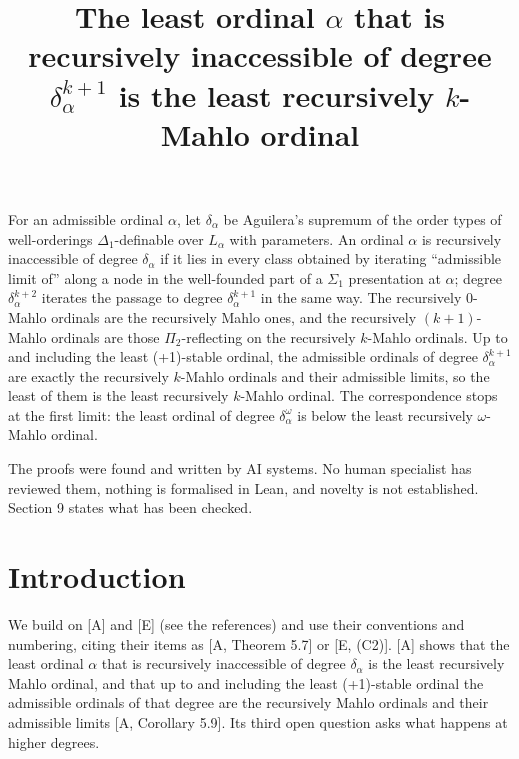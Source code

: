 \documentclass[11pt]{article}
\title{The least ordinal $\alpha$ that is recursively inaccessible of degree $\delta_\alpha^{k+1}$ is the least
recursively $k$-Mahlo ordinal}
\date{\paperversion}
\begin{document}
\newcommand{\Ad}{\mathrm{Ad}}
\newcommand{\Lim}{\mathrm{Lim}\,}
\newcommand{\CA}{C_{\mathrm{Ad}}}
\newcommand{\Lv}{\mathcal{L}}
\newcommand{\Cert}{\mathrm{Cert}}
\newcommand{\Tb}{\mathcal{T}}
\newcommand{\WF}{\mathrm{WF}}
\newcommand{\In}{\mathrm{In}}
\newcommand{\up}{{\uparrow}}
\newcommand{\Adm}{\mathrm{Adm}}
\maketitle

\begin{frontnote} For an admissible ordinal $\alpha$, let $\delta_\alpha$ be Aguilera's supremum of the
order types of well-orderings $\Delta_1$-definable over $L_\alpha$ with parameters. An ordinal $\alpha$ is recursively
inaccessible of degree $\delta_\alpha$ if it lies in every class obtained by iterating ``admissible limit of'' along a
node in the well-founded part of a $\Sigma_1$ presentation at $\alpha$; degree $\delta_\alpha^{k+2}$ iterates the
passage to degree $\delta_\alpha^{k+1}$ in the same way. The recursively $0$-Mahlo ordinals are the recursively Mahlo
ones, and the recursively $(k+1)$-Mahlo ordinals are those $\Pi_2$-reflecting on the recursively $k$-Mahlo ordinals.
Up to and including the least (+1)-stable ordinal, the admissible ordinals of degree $\delta_\alpha^{k+1}$ are exactly
the recursively $k$-Mahlo ordinals and their admissible limits, so the least of them is the least recursively
$k$-Mahlo ordinal. The correspondence stops at the first limit: the least ordinal of degree $\delta_\alpha^\omega$ is
below the least recursively $\omega$-Mahlo ordinal.
\end{frontnote}

\begin{frontnote} The proofs were found and written by AI systems. No human specialist has
reviewed them, nothing is formalised in Lean, and novelty is not established. Section 9 states what has been checked.
\end{frontnote}

\section{Introduction}

We build on [A] and [E] (see the references) and use their conventions and numbering, citing their items as [A,
Theorem 5.7] or [E, (C2)]. [A] shows that the least ordinal $\alpha$ that is recursively inaccessible of degree
$\delta_\alpha$ is the least recursively Mahlo ordinal, and that up to and including the least (+1)-stable
ordinal the admissible ordinals of that degree are the recursively Mahlo ordinals and their
admissible limits [A, Corollary 5.9]. Its third open question asks what happens at higher degrees.
\end{document}
